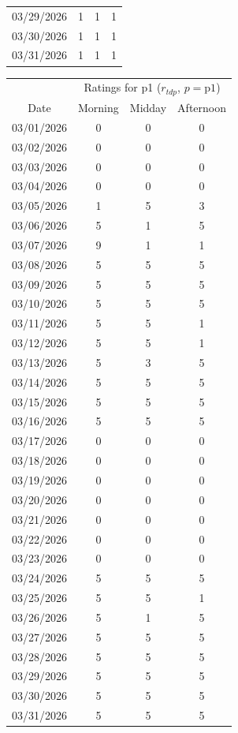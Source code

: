 \documentclass{notes}
\begin{document}
\begin{center}
\begin{tabular}{c|ccc}
		03/29/2026 & 1 & 1 & 1\\
		03/30/2026 & 1 & 1 & 1\\
		03/31/2026 & 1 & 1 & 1
	\end{tabular}\qquad
	\begin{tabular}{c|ccc}
		& \multicolumn{3}{c}{Ratings for p1 ($r_{tdp}$, $p=\text{p1}$)}\\
		Date & Morning & Midday & Afternoon\\
		\hline
		03/01/2026 & 0 & 0 & 0\\
		03/02/2026 & 0 & 0 & 0\\
		03/03/2026 & 0 & 0 & 0\\
		03/04/2026 & 0 & 0 & 0\\
		03/05/2026 & 1 & 5 & 3\\
		03/06/2026 & 5 & 1 & 5\\
		03/07/2026 & 9 & 1 & 1\\
		03/08/2026 & 5 & 5 & 5\\
		03/09/2026 & 5 & 5 & 5\\
		03/10/2026 & 5 & 5 & 5\\
		03/11/2026 & 5 & 5 & 1\\
		03/12/2026 & 5 & 5 & 1\\
		03/13/2026 & 5 & 3 & 5\\
		03/14/2026 & 5 & 5 & 5\\
		03/15/2026 & 5 & 5 & 5\\
		03/16/2026 & 5 & 5 & 5\\
		03/17/2026 & 0 & 0 & 0\\
		03/18/2026 & 0 & 0 & 0\\
		03/19/2026 & 0 & 0 & 0\\
		03/20/2026 & 0 & 0 & 0\\
		03/21/2026 & 0 & 0 & 0\\
		03/22/2026 & 0 & 0 & 0\\
		03/23/2026 & 0 & 0 & 0\\
		03/24/2026 & 5 & 5 & 5\\
		03/25/2026 & 5 & 5 & 1\\
		03/26/2026 & 5 & 1 & 5\\
		03/27/2026 & 5 & 5 & 5\\
		03/28/2026 & 5 & 5 & 5\\
		03/29/2026 & 5 & 5 & 5\\
		03/30/2026 & 5 & 5 & 5\\
		03/31/2026 & 5 & 5 & 5
	\end{tabular}


\end{center}
\end{document}
